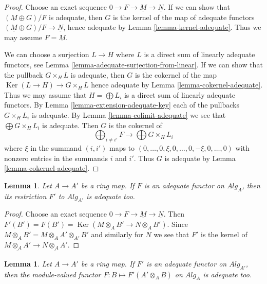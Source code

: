 \documentclass{stacks-project}
\theoremstyle{plain}
\newtheorem{lemma}[subsection]{Lemma}
\theoremstyle{definition}
\theoremstyle{remark}
\numberwithin{equation}{subsection}
\def\Ker{\mathop{\mathrm{Ker}}}
\begin{document}
\begin{proof}
Choose an exact sequence $0 \to F \to \underline{M} \to \underline{N}$.
If we can show that $(\underline{M} \oplus G)/F$ is adequate, then
$G$ is the kernel of the map of adequate functors
$(\underline{M} \oplus G)/F \to \underline{N}$, hence
adequate by
Lemma \ref{lemma-kernel-adequate}.
Thus we may assume $F = \underline{M}$.

\medskip\noindent
We can choose a surjection $L \to H$ where $L$ is a direct sum of
linearly adequate functors, see
Lemma \ref{lemma-adequate-surjection-from-linear}.
If we can show that the pullback $G \times_H L$ is adequate, then
$G$ is the cokernel of the map $\Ker(L \to H) \to G \times_H L$
hence adequate by
Lemma \ref{lemma-cokernel-adequate}.
Thus we may assume that $H = \bigoplus L_i$ is a direct sum of
linearly adequate functors. By
Lemma \ref{lemma-extension-adequate-key}
each of the pullbacks $G \times_H L_i$ is adequate. By
Lemma \ref{lemma-colimit-adequate}
we see that $\bigoplus G \times_H L_i$ is adequate.
Then $G$ is the cokernel of
$$
\bigoplus\nolimits_{i \not = i'} F \longrightarrow
\bigoplus G \times_H L_i
$$
where $\xi$ in the summand $(i, i')$ maps to
$(0, \ldots, 0, \xi, 0, \ldots, 0, -\xi, 0, \ldots, 0)$
with nonzero entries in the summands $i$ and $i'$.
Thus $G$ is adequate by
Lemma \ref{lemma-cokernel-adequate}.
\end{proof}

\begin{lemma}
\label{lemma-base-change-adequate}
Let $A \to A'$ be a ring map. If $F$ is an adequate functor on
$\textit{Alg}_A$, then its restriction $F'$ to
$\textit{Alg}_{A'}$ is adequate too.
\end{lemma}

\begin{proof}
Choose an exact sequence $0 \to F \to \underline{M} \to \underline{N}$.
Then $F'(B') = F(B') = \Ker(M \otimes_A B' \to N \otimes_A B')$.
Since $M \otimes_A B' = M \otimes_A A' \otimes_{A'} B'$ and similarly
for $N$ we see that $F'$ is the kernel of
$\underline{M \otimes_A A'} \to \underline{N \otimes_A A'}$.
\end{proof}

\begin{lemma}
\label{lemma-pushforward-adequate}
Let $A \to A'$ be a ring map. If $F'$ is an adequate functor on
$\textit{Alg}_{A'}$, then the module-valued functor
$F : B \mapsto F'(A' \otimes_A B)$ on $\textit{Alg}_A$ is adequate too.
\end{lemma}
\end{document}
